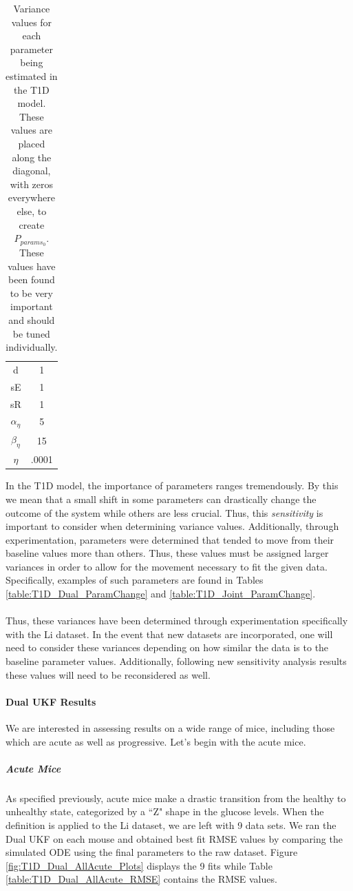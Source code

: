 \begin{table}[H]
\begin{center}
\begin{tabular}{c|c}
      {d} & 1\\
      {sE} & 1\\
      {sR} & 1\\
      {$\alpha_\eta$} & 5\\
      {$\beta_\eta$} & 15\\
      {$\eta$} & .0001
    \end{tabular}
    \caption{Variance values for each parameter being estimated in the T1D model. These values are placed along the diagonal, with zeros everywhere else, to create $P_{params_0}$. These values have been found to be very important and should be tuned individually.}
    \label{table:T1D_Dual_ParamVariances}
  \end{center}
\end{table}

In the T1D model, the importance of parameters ranges tremendously. By this we mean that a small shift in some parameters can drastically change the outcome of the system while others are less crucial. Thus, this \emph{sensitivity} is important to consider when determining variance values. Additionally, through experimentation, parameters were determined that tended to move from their baseline values more than others. Thus, these values must be assigned larger variances in order to allow for the movement necessary to fit the given data. Specifically, examples of such parameters are found in Tables \ref{table:T1D_Dual_ParamChange} and \ref{table:T1D_Joint_ParamChange}.\\
\\
Thus, these variances have been determined through experimentation specifically with the Li dataset. In the event that new datasets are incorporated, one will need to consider these variances depending on how similar the data is to the baseline parameter values. Additionally, following new sensitivity analysis results these values will need to be reconsidered as well. 



\paragraph{Dual UKF Results} \label{section:T1D_DualUKF_Results}
We are interested in assessing results on a wide range of mice, including those which are acute as well as progressive. Let's begin with the acute mice.

\subparagraph{Acute Mice}
As specified previously, acute mice make a drastic transition from the healthy to unhealthy state, categorized by a ``Z" shape in the glucose levels. When the definition is applied to the Li dataset, we are left with 9 data sets. We ran the Dual UKF on each mouse and obtained best fit RMSE values by comparing the simulated ODE using the final parameters to the raw dataset. Figure \ref{fig:T1D_Dual_AllAcute_Plots} displays the 9 fits while Table \ref{table:T1D_Dual_AllAcute_RMSE} contains the RMSE values.\\

